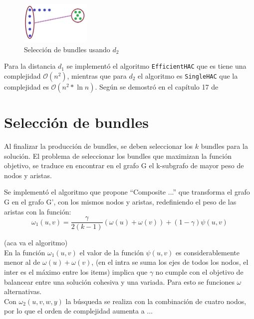 \begin{figure}[H]
  \centering
    \includegraphics[width=0.3\textwidth]{img/cluster1.png}
  \caption{Selección de bundles usando $d_{2}$}
  \label{res:img-usingSingleHAC}
\end{figure}

Para la distancia $d_{1}$ se implementó el algoritmo \texttt{EfficientHAC} que es tiene una 
complejidad $\mathcal{O}(n^{2})$, mientras que para $d_{2}$ el algoritmo es \texttt{SingleHAC} que 
la complejidad es $\mathcal{O}(n^{2} * \ln{n})$. Según se demostró en el capítulo 17 de 
\cite{informationRetrival}


\section{Selección de bundles}
Al finalizar la producción de bundles, se deben seleccionar los $k$ bundles para la solución.
El problema de seleccionar los bundles que maximizan la función objetivo, se traduce en 
encontrar en el grafo G el k-subgrafo de mayor peso de nodos y aristas.

Se implementó el algoritmo que propone ``Composite ...''\cite{compositeRetrival} que transforma el 
grafo G en el grafo G', con los mismos nodos y aristas, redefiniendo el peso de las aristas con la 
función:\\

\begin{equation}
\omega_{1}(u,v) = \dfrac{\gamma}{2( k - 1)} (\omega(u) + \omega(v)) + (1 - \gamma)\psi(u,v) 
\end{equation}

(aca va el algoritmo)\\

En la función $\omega_{1}(u,v)$ el valor de la función $\psi(u,v)$  es considerablemente menor al de
$\omega(u) + \omega(v)$, (en el intra se suma los ejes de todos los nodos, el inter es el máximo entre los items)
implica que $\gamma$ no cumple con el objetivo de balancear entre una solución cohesiva y una variada.
Para esto se funciones $\omega$ alternativas.\\

Con $\omega_{2}(u,v,w,y)$ la búsqueda se realiza con la combinación de cuatro nodos, por lo que el orden de complejidad
aumenta a ...

